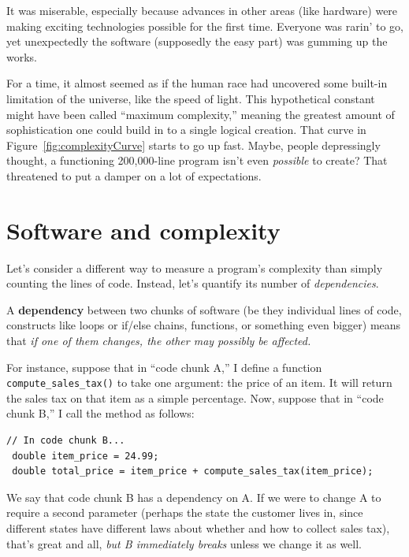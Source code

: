 It was miserable, especially because advances in other areas (like hardware)
were making exciting technologies possible for the first time. Everyone was
rarin' to go, yet unexpectedly the software (supposedly the easy part) was
gumming up the works.

For a time, it almost seemed as if the human race had uncovered some built-in
limitation of the universe, like the speed of light. This hypothetical
constant might have been called ``maximum complexity,'' meaning the greatest
amount of sophistication one could build in to a single logical creation. That
curve in Figure~\ref{fig:complexityCurve} starts to go up fast. Maybe, people
depressingly thought, a functioning 200,000-line program isn't even
\textit{possible} to create? That threatened to put a damper on a lot of
expectations.

\section{Software and complexity}

Let's consider a different way to measure a program's complexity than simply
counting the lines of code. Instead, let's quantify its number of
\textit{dependencies}.

A \textbf{dependency} between two chunks of software (be they individual lines
of code, constructs like loops or if/else chains, functions, or something even
bigger) means that \textit{if one of them changes, the other may possibly be
affected.}

 For instance,
suppose that in ``code chunk A,'' I define a function
\texttt{compute\_sales\_tax()} to take one argument: the price of an item. It
will return the sales tax on that item as a simple percentage. Now, suppose
that in ``code chunk B,'' I call the method as follows:

\begin{Verbatim}[fontsize=\footnotesize,samepage=true,frame=single]
 // In code chunk B...
 double item_price = 24.99;
 double total_price = item_price + compute_sales_tax(item_price);
\end{Verbatim}

We say that code chunk B has a dependency on A. If we were to change A to
require a second parameter (perhaps the state the customer lives in, since
different states have different laws about whether and how to collect sales
tax), that's great and all, \textit{but B immediately breaks} unless we change
it as well.

